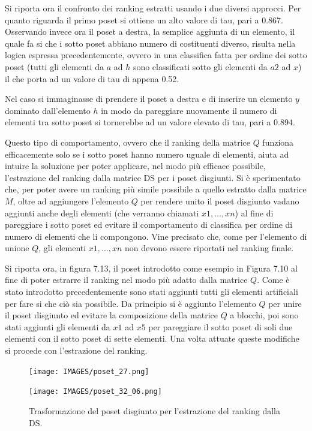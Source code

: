 \documentclass{report}
\begin{document}
Si riporta ora il confronto dei ranking estratti usando i due diversi approcci. Per quanto riguarda il primo poset si ottiene un alto valore di tau, pari a 0.867. Osservando invece ora il poset a destra, la semplice aggiunta di un elemento, il quale fa si che i sotto poset abbiano numero di costituenti diverso, risulta nella logica espressa precedentemente, ovvero in una classifica fatta per ordine dei sotto poset (tutti gli elementi da $a$ ad $h$ sono classificati sotto gli elementi da $a2$ ad $x$) il che porta ad un valore di tau di appena 0.52.


Nel caso si immaginasse di prendere il poset a destra e di inserire un elemento $y$ dominato dall'elemento $h$ in modo da pareggiare nuovamente il numero di elementi tra sotto poset si tornerebbe ad un valore elevato di tau, pari a 0.894.


Questo tipo di comportamento, ovvero che il ranking della matrice $Q$ funziona efficacemente solo se i sotto poset hanno numero uguale di elementi, aiuta ad intuire la soluzione per poter applicare, nel modo più efficace possibile, l'estrazione del ranking dalla matrice DS per i poset disgiunti. Si è sperimentato che, per poter avere un ranking più simile possibile a quello estratto dalla matrice $M$, oltre ad aggiungere l'elemento $Q$ per rendere unito il poset disgiunto vadano aggiunti anche degli elementi (che verranno chiamati $x1, ...,xn$) al fine di pareggiare i sotto poset ed evitare il comportamento di classifica per ordine di numero di elementi che li compongono. Vine precisato che, come per l'elemento di unione $Q$, gli elementi $x1, ...,xn$ non devono essere riportati nel ranking finale.


Si riporta ora, in figura 7.13, il poset introdotto come esempio in Figura 7.10 al fine di poter estrarre il ranking nel modo più adatto dalla matrice $Q$. Come è stato introdotto precedentemente sono stati aggiunti tutti gli elementi artificiali per fare si che ciò sia possibile. Da principio si è aggiunto l'elemento $Q$ per unire il poset disgiunto ed evitare la composizione della matrice $Q$ a blocchi, poi sono stati aggiunti gli elementi da $x1$ ad $x5$ per pareggiare il sotto poset di soli due elementi con il sotto poset di sette elementi. Una volta attuate queste modifiche si procede con l'estrazione del ranking.

\begin{figure}[H]
  \centering
  \begin{minipage}[b]{0.4\textwidth}
    \texttt{[image: IMAGES/poset\_27.png]}
  \end{minipage}
  \hfill
  \begin{minipage}[b]{0.4\textwidth}
    \texttt{[image: IMAGES/poset\_32\_06.png]}
  \end{minipage}
  \caption{Trasformazione del poset disgiunto per l'estrazione del ranking dalla DS.}
\end{figure}
\end{document}
